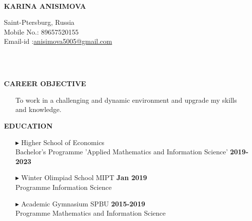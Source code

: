 \documentclass[a4paper,10pt]{article}
\begin{document}
	\hspace{0.5cm}\\[-0.2cm]
	\begin{minipage}{0.5\textwidth}
		\begin{flushleft}
			\huge \textbf{\* \* KARINA ANISIMOVA} 
			\normalsize
		\end{flushleft}
	\end{minipage}
	\begin{minipage}{0.51\textwidth}
		\begin{flushright}
			\textcolor[gray]{0.3}{
				\indent Saint-Ptersburg, Russia\\
				\indent Mobile No.: 89657520155  \\
				\indent Email-id :\href{mailto:anisimova5005@gmail.com} {anisimova5005@gmail.com}\\  	
			}
		\end{flushright}
	\end{minipage}
    \\ \\
    
    
    \colorbox{magicmint}{
		\begin{minipage}{0.96\textwidth}
			\textbf{CAREER OBJECTIVE}
		\end{minipage}
	}
	\begin{itemize}
		\item[]To work in a challenging and dynamic environment and upgrade my skills and knowledge.
	\end{itemize}

	 \colorbox{magicmint}{
		\begin{minipage}{0.96\textwidth}
			\textbf{EDUCATION}
		\end{minipage}
	}

	\begin{itemize}
		\item [$\blacktriangleright$]  Higher School of Economics\\ Bachelor’s Programme 'Applied Mathematics and Information Science' \hspace{3.9cm} \textbf{2019-2023}
		\item[$\blacktriangleright$]  Winter Olimpiad School MIPT \hspace{10.4cm}\textbf{Jan 2019} \\ Programme Information Science 
		\item[$\blacktriangleright$]  Academic Gymnasium SPBU \hspace{10.4cm}\textbf{2015-2019} \\ Programme Mathematics and Information Science 
	\end{itemize}
	
\end{document}
